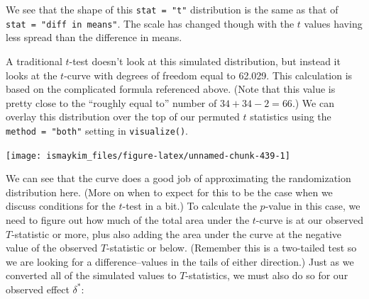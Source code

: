 \documentclass[12pt, krantz2,]{krantz}
\makeatletter
\newenvironment{Shaded}{\begin{snugshade}}{\end{snugshade}}
\newcommand{\DataTypeTok}[1]{\textcolor[rgb]{0.27,0.27,0.27}{#1}}
\newcommand{\KeywordTok}[1]{\textcolor[rgb]{0.27,0.27,0.27}{\textbf{#1}}}
\newcommand{\NormalTok}[1]{#1}
\newcommand{\OperatorTok}[1]{\textcolor[rgb]{0.43,0.43,0.43}{\textbf{#1}}}
\newcommand{\StringTok}[1]{\textcolor[rgb]{0.5,0.5,0.5}{#1}}
\newenvironment{kframe}{%
\medskip{}
\setlength{\fboxsep}{.8em}
 \def\at@end@of@kframe{}%
 \ifinner\ifhmode%
  \def\at@end@of@kframe{\end{minipage}}%
  \begin{minipage}{\columnwidth}%
 \fi\fi%
 \def\FrameCommand##1{\hskip\@totalleftmargin \hskip-\fboxsep
 \colorbox{shadecolor}{##1}\hskip-\fboxsep
     \hskip-\linewidth \hskip-\@totalleftmargin \hskip\columnwidth}%
 \MakeFramed {\advance\hsize-\width
   \@totalleftmargin\z@ \linewidth\hsize
   \@setminipage}}%
 {\par\unskip\endMakeFramed%
 \at@end@of@kframe}
\renewenvironment{Shaded}{\begin{kframe}}{\end{kframe}}
\makeatother
\begin{document}
We see that the shape of this \texttt{stat\ =\ "t"} distribution is the same as that of \texttt{stat\ =\ "diff\ in\ means"}. The scale has changed though with the \(t\) values having less spread than the difference in means.

A traditional \(t\)-test doesn't look at this simulated distribution, but instead it looks at the \(t\)-curve with degrees of freedom equal to 62.029. This calculation is based on the complicated formula referenced above. (Note that this value is pretty close to the ``roughly equal to'' number of \(34 + 34 - 2 = 66\).) We can overlay this distribution over the top of our permuted \(t\) statistics using the \texttt{method\ =\ "both"} setting in \texttt{visualize()}.

\begin{Shaded}
\end{Shaded}

\begin{center}\texttt{[image: ismaykim\_files/figure-latex/unnamed-chunk-439-1]} \end{center}

We can see that the curve does a good job of approximating the randomization distribution here. (More on when to expect for this to be the case when we discuss conditions for the \(t\)-test in a bit.) To calculate the \(p\)-value in this case, we need to figure out how much of the total area under the \(t\)-curve is at our observed \(T\)-statistic or more, plus also adding the area under the curve at the negative value of the observed \(T\)-statistic or below. (Remember this is a two-tailed test so we are looking for a difference--values in the tails of either direction.) Just as we converted all of the simulated values to \(T\)-statistics, we must also do so for our observed effect \(\delta^*\):

\begin{Shaded}
\end{Shaded}
\end{document}

